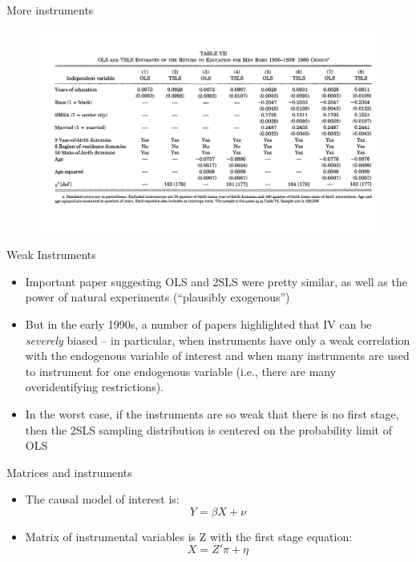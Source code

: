 \documentclass{beamer}
\begin{document}
\begin{frame}{More instruments}

	\begin{figure}
	\includegraphics[scale=.18]{./lecture_includes/weak_qob3.png}
	\end{figure}
	

\end{frame}


\begin{frame}{Weak Instruments}
	
	\begin{itemize}
	\item Important paper suggesting OLS and 2SLS were pretty similar, as well as the power of natural experiments (``plausibly exogenous'')
	\item But in the early 1990s, a number of papers highlighted that IV can be \emph{severely} biased -- in particular, when instruments have only a weak correlation with the endogenous variable of interest and when many instruments are used to instrument for one endogenous variable (i.e., there are many overidentifying restrictions).
	\item In the worst case, if the instruments are so weak that there is no first stage, then the 2SLS sampling distribution is centered on the probability limit of OLS
	\end{itemize}
\end{frame}



\begin{frame}{Matrices and instruments}

\begin{itemize}
	\item The causal model of interest is: $$Y=\beta X + \nu$$
	\item Matrix of instrumental variables is Z with the first stage equation:$$X = {Z'}\pi + \eta$$
\end{itemize}

\end{frame}
\end{document}

